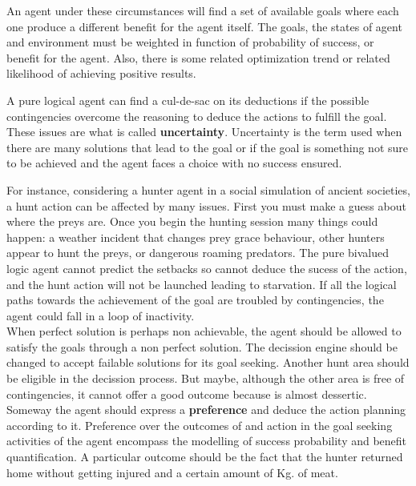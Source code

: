 \documentclass[11pt,oneside,a4paper,openright]{report}
\begin{document}
\begin{description}
\begin{description}
		An agent under these circumstances will find a set of available goals where each one produce a
		different benefit for the agent itself. The goals, the states of agent and environment must be 
		weighted in function of probability of success, or benefit for the agent. Also, there is some related
		optimization trend or related likelihood of achieving positive results. 

		A pure logical agent can find a cul-de-sac on its deductions if the possible contingencies overcome
		the reasoning to deduce the actions to fulfill the goal. These issues are what is called
		\textbf{uncertainty}. Uncertainty is the term used when there are many solutions that lead to the
		goal or if the goal is something not sure to be achieved and the agent faces a choice with no 
		success ensured. 

		For instance, considering a hunter agent in a social simulation of ancient societies, a hunt action
		can be affected by many issues. First you must make a guess about where the preys are. Once you 
		begin the hunting session many things could happen: a weather incident that changes prey grace
		behaviour, other hunters appear to hunt the preys, or dangerous roaming predators. The pure bivalued
		logic agent cannot predict the setbacks so cannot deduce the sucess of the action, and the hunt 
		action will not be launched leading to starvation. If all the logical paths towards the achievement 
		of the goal are troubled by contingencies, the agent could fall in a loop of inactivity.\\ 
		When perfect solution is perhaps non achievable, the agent should be allowed to satisfy the goals
		through a non perfect solution. The decission engine should be changed to accept failable solutions 
		for its goal seeking. Another hunt area should be eligible in the decission process. But maybe,
		although the other area is free of contingencies, it cannot offer a good outcome because is almost
		dessertic. Someway the agent should express a \textbf{preference} and deduce the action planning
		according to it. Preference over the outcomes of and action in the goal seeking activities of the 
		agent encompass the modelling of success probability and benefit quantification. A particular outcome
		should be the fact that the hunter returned home without getting injured and a certain amount of 
		Kg. of meat. 


\end{description}
\end{description}
\end{document}

